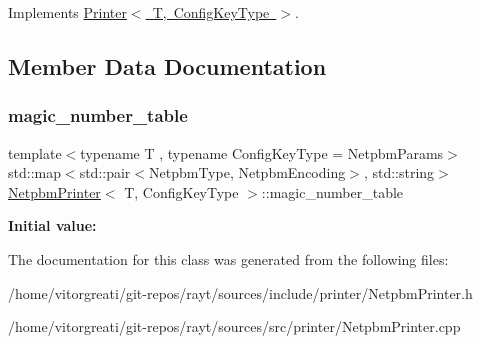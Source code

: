 Implements \mbox{\hyperlink{class_printer_a76931150a7fb3d4a69c3483bd08eed17}{Printer$<$ T, Config\+Key\+Type $>$}}.



\subsection{Member Data Documentation}
\mbox{\label{class_netpbm_printer_a8ca68fe204b021de766e45d6d71569c5}} 
\subsubsection{\texorpdfstring{magic\_number\_table}{magic\_number\_table}}
{\footnotesize\ttfamily template$<$typename T , typename Config\+Key\+Type  = Netpbm\+Params$>$ \\
std\+::map$<$std\+::pair$<$Netpbm\+Type, Netpbm\+Encoding$>$, std\+::string$>$ \mbox{\hyperlink{class_netpbm_printer}{Netpbm\+Printer}}$<$ T, Config\+Key\+Type $>$\+::magic\+\_\+number\+\_\+table}

{\bfseries Initial value\+:}
\begin{DoxyCode}{0}
\DoxyCodeLine{= \{}
\DoxyCodeLine{        \}}

\end{DoxyCode}


The documentation for this class was generated from the following files\+:\begin{DoxyCompactItemize}
\item 
/home/vitorgreati/git-\/repos/rayt/sources/include/printer/Netpbm\+Printer.\+h\item 
/home/vitorgreati/git-\/repos/rayt/sources/src/printer/Netpbm\+Printer.\+cpp\end{DoxyCompactItemize}
